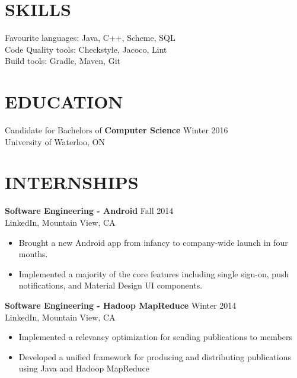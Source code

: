 \documentclass[margin]{res}
\begin{document}
 


 
 
\address{cckroets@uwaterloo.ca \\ 4A Computer Science}
\address{
	\href{http://www.github.com/cckroets}	{\sf \bf github.com/cckroets} \\ 
	\href{http://linkd.in/1yeGzGo}			{\sf \bf linkd.in/1yeGzGo} 
}


 
\begin{resume} 

\section{SKILLS} 
Favourite languages: Java, C++, Scheme, SQL \\
Code Quality tools: Checkstyle, Jacoco, Lint \\
Build tools: Gradle, Maven, Git 

\section{EDUCATION} 
Candidate for Bachelors of {\bf Computer Science} \hfill Winter 2016 \\
University of Waterloo, ON  

\section{INTERNSHIPS}
{\bf Software Engineering - Android} \hfill Fall 2014 \\ LinkedIn, Mountain View, CA
 \begin{itemize} \itemsep -2pt  %
 \item Brought a new Android app from infancy to company-wide launch in four months.
 \item Implemented a majority of the core features including single sign-on, push notifications, and Material Design UI components.
\end{itemize}

 {\bf Software Engineering - Hadoop MapReduce} \hfill Winter 2014 \\ LinkedIn, Mountain View, CA 
 \begin{itemize} \itemsep -2pt  %
 \item Implemented a relevancy optimization for sending publications to members
 \item {\mbox Developed a unified framework for producing and distributing publications using Java and Hadoop MapReduce}	
\end{itemize}
 

\end{resume}
\end{document}
